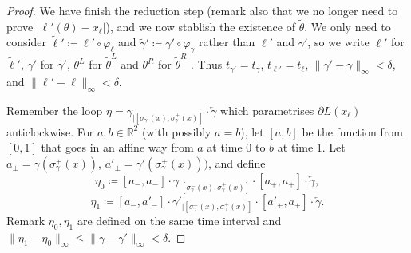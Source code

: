 \documentclass[11pt]{article}
\begin{document}
\begin{proof}
We have finish the reduction step (remark also that we no longer need to prove $|{\ell}'({\theta})-x_\ell|$), and we now stablish the existence of $\tilde{\theta}$. We only need to consider $\tilde{\ell}'\coloneqq \ell'\circ \varphi_{\ell}$ and $\tilde{\gamma}'\coloneqq \gamma'\circ \varphi_{\gamma}$ rather than $\ell'$ and $\gamma'$, so we write $\ell'$ for $\tilde{\ell}'$, $\gamma'$ for $\tilde{\gamma}'$, $\theta^L$ for $\tilde{\theta}^L$ and $\theta^R$ for $\tilde{\theta}^R$ .
  Thus $t_{\gamma'}=t_\gamma$, $t_{\ell'}=t_\ell$, $\|\gamma'-\gamma\|_\infty<\delta$, and $\|\ell'-\ell\|_\infty<\delta$.

  Remember the loop
  $\eta= \gamma_{|[\sigma_\gamma^-(x), \sigma_\gamma^+(x)]}\cdot \overleftarrow{\gamma}$ which parametrises $\partial L(x_\ell)$ anticlockwise.
  For $a,b\in \mathbb{R}^2$ (with possibly $a=b$), let $[a,b]$ be the function from $[0,1]$ that goes in an affine way from $a$ at time $0$ to $b$ at time $1$.
  Let $a_\pm=\gamma(\sigma_\gamma^\pm(x))$, $a'_\pm=\gamma'(\sigma_\gamma^\pm(x)))$, and define
  \[ \eta_0\coloneqq [a_-,a_-]\cdot \gamma_{|[\sigma_\gamma^-(x), \sigma_\gamma^+(x)]}\cdot [a_+,a_+]\cdot\overleftarrow{\gamma},\]
  \[ \eta_1\coloneqq [a_-,a'_-]\cdot \gamma'_{|[\sigma_\gamma^-(x), \sigma_\gamma^+(x)]}\cdot [a'_+,a_+]\cdot \overleftarrow{\gamma}.\]
  Remark $\eta_0,\eta_1$ are defined on the same time interval and $\|\eta_1-\eta_0\|_\infty\leq\|\gamma-\gamma'\|_\infty<\delta$.


\end{proof}
\end{document}
